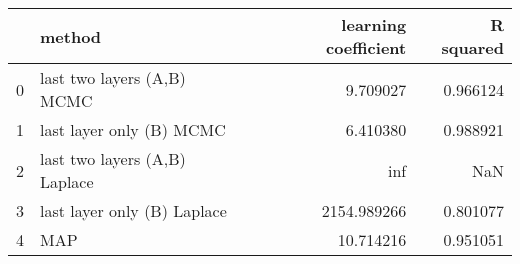 \begin{tabular}{llrr}
\toprule
{} &                         method &  learning coefficient &  R squared \\
\midrule
0 &     last two layers (A,B) MCMC &              9.709027 &   0.966124 \\
1 &       last layer only (B) MCMC &              6.410380 &   0.988921 \\
2 &  last two layers (A,B) Laplace &                   inf &        NaN \\
3 &    last layer only (B) Laplace &           2154.989266 &   0.801077 \\
4 &                            MAP &             10.714216 &   0.951051 \\
\bottomrule
\end{tabular}
